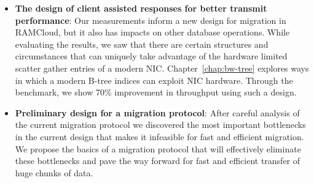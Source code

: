 \begin{itemize}
\item{\textbf{The design of client assisted responses for better transmit performance}}: Our measurements inform a new design for migration in RAMCloud, but it also has impacts on other database operations.
 While evaluating the results, we saw that there are certain structures and circumstances that can uniquely take advantage of the hardware limited scatter gather entries of a modern NIC.
 Chapter~\ref{chap:bw-tree} explores ways in which a modern B-tree indices can exploit NIC hardware.
 Through the benchmark, we show 70\% improvement in throughput using such a design.

\item{\textbf{Preliminary design for a migration protocol}}: After careful analysis of the current migration protocol
 we discovered the most important bottlenecks in the current design that makes it infeasible for fast and efficient migration.
 We propose the basics of a migration protocol that will effectively eliminate these bottlenecks and pave the way
 forward for fast and efficient transfer of huge chunks of data.

\end{itemize}

